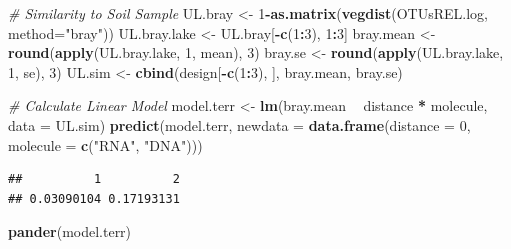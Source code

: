 \documentclass[]{article}
\newenvironment{Shaded}{\begin{snugshade}}{\end{snugshade}}
\newcommand{\CommentTok}[1]{\textcolor[rgb]{0.56,0.35,0.01}{\textit{#1}}}
\newcommand{\DataTypeTok}[1]{\textcolor[rgb]{0.13,0.29,0.53}{#1}}
\newcommand{\DecValTok}[1]{\textcolor[rgb]{0.00,0.00,0.81}{#1}}
\newcommand{\KeywordTok}[1]{\textcolor[rgb]{0.13,0.29,0.53}{\textbf{#1}}}
\newcommand{\NormalTok}[1]{#1}
\newcommand{\OperatorTok}[1]{\textcolor[rgb]{0.81,0.36,0.00}{\textbf{#1}}}
\newcommand{\StringTok}[1]{\textcolor[rgb]{0.31,0.60,0.02}{#1}}
\begin{document}
\begin{Shaded}
\begin{Highlighting}[]
\CommentTok{# Similarity to Soil Sample}
\NormalTok{UL.bray      <-}\StringTok{ }\DecValTok{1}\OperatorTok{-}\KeywordTok{as.matrix}\NormalTok{(}\KeywordTok{vegdist}\NormalTok{(OTUsREL.log, }\DataTypeTok{method=}\StringTok{"bray"}\NormalTok{))}
\NormalTok{UL.bray.lake <-}\StringTok{ }\NormalTok{UL.bray[}\OperatorTok{-}\KeywordTok{c}\NormalTok{(}\DecValTok{1}\OperatorTok{:}\DecValTok{3}\NormalTok{), }\DecValTok{1}\OperatorTok{:}\DecValTok{3}\NormalTok{] }
\NormalTok{bray.mean    <-}\StringTok{ }\KeywordTok{round}\NormalTok{(}\KeywordTok{apply}\NormalTok{(UL.bray.lake, }\DecValTok{1}\NormalTok{, mean), }\DecValTok{3}\NormalTok{)}
\NormalTok{bray.se      <-}\StringTok{ }\KeywordTok{round}\NormalTok{(}\KeywordTok{apply}\NormalTok{(UL.bray.lake, }\DecValTok{1}\NormalTok{, se), }\DecValTok{3}\NormalTok{)}
\NormalTok{UL.sim       <-}\StringTok{ }\KeywordTok{cbind}\NormalTok{(design[}\OperatorTok{-}\KeywordTok{c}\NormalTok{(}\DecValTok{1}\OperatorTok{:}\DecValTok{3}\NormalTok{), ], bray.mean, bray.se)}

\CommentTok{# Calculate Linear Model}
\NormalTok{model.terr <-}\StringTok{ }\KeywordTok{lm}\NormalTok{(bray.mean }\OperatorTok{~}\StringTok{ }\NormalTok{distance }\OperatorTok{*}\StringTok{ }\NormalTok{molecule, }\DataTypeTok{data =}\NormalTok{ UL.sim)}
\KeywordTok{predict}\NormalTok{(model.terr, }\DataTypeTok{newdata =} \KeywordTok{data.frame}\NormalTok{(}\DataTypeTok{distance =} \DecValTok{0}\NormalTok{, }\DataTypeTok{molecule =} \KeywordTok{c}\NormalTok{(}\StringTok{"RNA"}\NormalTok{, }\StringTok{"DNA"}\NormalTok{)))}
\end{Highlighting}
\end{Shaded}

\begin{verbatim}
##          1          2 
## 0.03090104 0.17193131
\end{verbatim}

\begin{Shaded}
\begin{Highlighting}[]
\KeywordTok{pander}\NormalTok{(model.terr)}
\end{Highlighting}
\end{Shaded}
\end{document}
